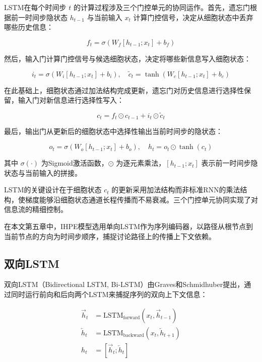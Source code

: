 LSTM在每个时间步 $t$ 的计算过程涉及三个门控单元的协同运作。首先，遗忘门根据前一时间步隐状态 $h_{t-1}$ 与当前输入 $x_t$ 计算门控信号，决定从细胞状态中丢弃哪些历史信息：

\begin{equation}
f_t = \sigma(W_f [h_{t-1}; x_t] + b_f)
\end{equation}

然后，输入门计算门控信号与候选细胞状态，决定将哪些新信息写入细胞状态：

\begin{equation}
i_t = \sigma(W_i [h_{t-1}; x_t] + b_i), \quad \tilde{c}_t = \tanh(W_c [h_{t-1}; x_t] + b_c)
\end{equation}

在此基础上，细胞状态通过加法结构完成更新，遗忘门对历史信息进行选择性保留，输入门对新信息进行选择性写入：

\begin{equation}
c_t = f_t \odot c_{t-1} + i_t \odot \tilde{c}_t
\end{equation}

最后，输出门从更新后的细胞状态中选择性输出当前时间步的隐状态：

\begin{equation}
o_t = \sigma(W_o [h_{t-1}; x_t] + b_o), \quad h_t = o_t \odot \tanh(c_t)
\end{equation}

其中 $\sigma(\cdot)$ 为Sigmoid激活函数，$\odot$ 为逐元素乘法，$[h_{t-1}; x_t]$ 表示前一时间步隐状态与当前输入的拼接。

LSTM的关键设计在于细胞状态 $c_t$ 的更新采用加法结构而非标准RNN的乘法结构，使梯度能够沿细胞状态通道长程传播而不易衰减。三个门控单元协同实现了对信息流的精细控制。

在本文第五章中，IHPE模型选用单向LSTM作为序列编码器，以路径从根节点到当前节点的方向为时间步顺序，捕捉讨论路径上的传播上下文依赖。

\subsection{双向LSTM}

双向LSTM（Bidirectional LSTM, Bi-LSTM）由Graves和Schmidhuber\cite{graves2005framewise}提出，通过同时运行前向和后向两个LSTM来捕捉序列的双向上下文信息：

\begin{align}
\overrightarrow{h}_t &= \text{LSTM}_{\text{forward}}(x_t, \overrightarrow{h}_{t-1}) \\
\overleftarrow{h}_t &= \text{LSTM}_{\text{backward}}(x_t, \overleftarrow{h}_{t+1}) \\
h_t &= [\overrightarrow{h}_t; \overleftarrow{h}_t]
\end{align}

